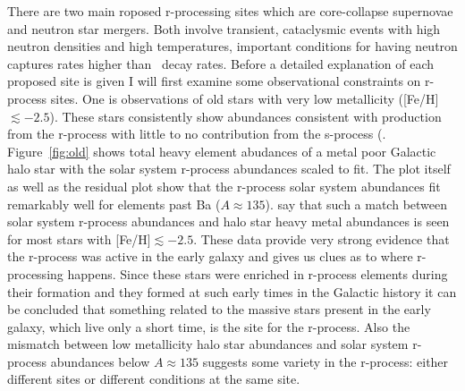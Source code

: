 {There are two main roposed r-processing sites which are core-collapse
supernovae and neutron star mergers.  Both involve transient, cataclysmic events
with high neutron densities and high temperatures, important
conditions for having neutron captures rates higher than \bminus\
decay rates.  Before a detailed explanation of each proposed site is
given I will first examine some observational constraints on r-process
sites. One is observations of old stars with very low
metallicity ([Fe/H]$\lesssim-2.5$).  These stars consistently show
abundances consistent with production from the r-process with little
to no contribution from the s-process (\citealt{truranetal2002}.  
Figure~\ref{fig:old} shows 
total heavy element abudances of a metal poor  Galactic halo star with
the solar system r-process abundances scaled to fit.  The plot itself as well
as the residual plot show that the r-process solar system abundances
fit remarkably well for elements past Ba ($A\approx 135$).  \cite{truranetal2002} say
that such a match between solar system r-process abundances and halo
star heavy metal abundances is seen for most stars with
[Fe/H]$\lesssim-2.5$.  These data provide very strong evidence that
the r-process was active in the early galaxy and gives us clues as to
where r-processing happens.  Since these stars were enriched in
r-process elements during their formation and they formed at such
early times in the Galactic history it can be concluded that something
related to the 
massive stars present in the early galaxy, which live only a short
time, is the site for the r-process.  Also the mismatch between low
metallicity halo star abundances and solar system r-process abundances
below $A\approx135$ suggests some variety in the r-process: either
different sites or different conditions at the same site. 
\begin{figure}

\end{figure}}
